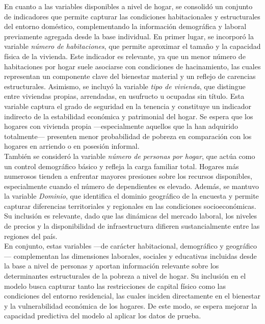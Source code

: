 \documentclass[12pt,a4paper,onecolumn]{article}
\begin{document}
En cuanto a las variables disponibles a nivel de hogar, se consolidó un conjunto de indicadores que permite capturar las condiciones habitacionales y estructurales del entorno doméstico, complementando la información demográfica y laboral previamente agregada desde la base individual. En primer lugar, se incorporó la variable \textit{número de habitaciones}, que permite aproximar el tamaño y la capacidad física de la vivienda. Este indicador es relevante, ya que un menor número de habitaciones por hogar suele asociarse con condiciones de hacinamiento, las cuales representan un componente clave del bienestar material y un reflejo de carencias estructurales. Asimismo, se incluyó la variable \textit{tipo de vivienda}, que distingue entre viviendas propias, arrendadas, en usufructo u ocupadas sin título. Esta variable captura el grado de seguridad en la tenencia y constituye un indicador indirecto de la estabilidad económica y patrimonial del hogar. Se espera que los hogares con vivienda propia —especialmente aquellos que la han adquirido totalmente— presenten menor probabilidad de pobreza en comparación con los hogares en arriendo o en posesión informal.\\

También se consideró la variable \textit{número de personas por hogar}, que actúa como un control demográfico básico y refleja la carga familiar total. Hogares más numerosos tienden a enfrentar mayores presiones sobre los recursos disponibles, especialmente cuando el número de dependientes es elevado. Además, se mantuvo la variable \textit{Dominio}, que identifica el dominio geográfico de la encuesta y permite capturar diferencias territoriales y regionales en las condiciones socioeconómicas. Su inclusión es relevante, dado que las dinámicas del mercado laboral, los niveles de precios y la disponibilidad de infraestructura difieren sustancialmente entre las regiones del país.\\

En conjunto, estas variables —de carácter habitacional, demográfico y geográfico— complementan las dimensiones laborales, sociales y educativas incluidas desde la base a nivel de personas y aportan información relevante sobre los determinantes estructurales de la pobreza a nivel de hogar. Su inclusión en el modelo busca capturar tanto las restricciones de capital físico como las condiciones del entorno residencial, las cuales inciden directamente en el bienestar y la vulnerabilidad económica de los hogares. De este modo, se espera mejorar la capacidad predictiva del modelo al aplicar los datos de prueba.\\
\end{document}
